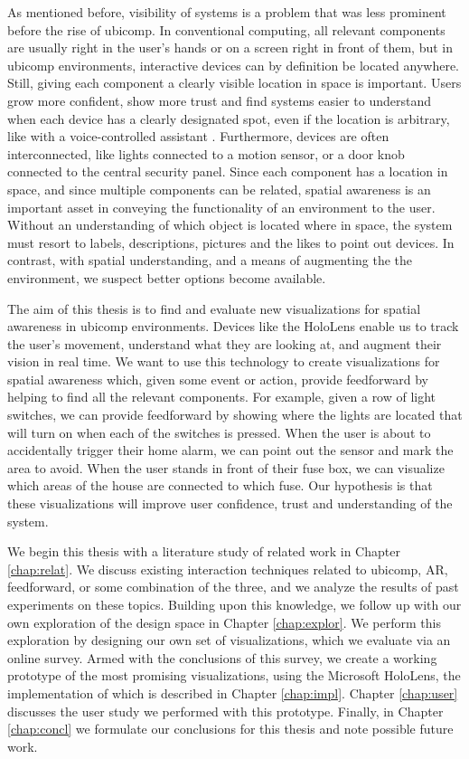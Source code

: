 As mentioned before, visibility of systems is a problem that was less prominent before the rise of ubicomp. In conventional computing, all relevant components are usually right in the user's hands or on a screen right in front of them, but in ubicomp environments, interactive devices can by definition be located anywhere. Still, giving each component a clearly visible location in space is important. Users grow more confident, show more trust and find systems easier to understand when each device has a clearly designated spot, even if the location is arbitrary, like with a voice-controlled assistant \cite{vermeulen2009bet}. Furthermore, devices are often interconnected, like lights connected to a motion sensor, or a door knob connected to the central security panel. Since each component has a location in space, and since multiple components can be related, spatial awareness is an important asset in conveying the functionality of an environment to the user. Without an understanding of which object is located where in space, the system must resort to labels, descriptions, pictures and the likes to point out devices. In contrast, with spatial understanding, and a means of augmenting the the environment, we suspect better options become available.

The aim of this thesis is to find and evaluate new visualizations for spatial awareness in ubicomp environments. Devices like the HoloLens enable us to track the user's movement, understand what they are looking at, and augment their vision in real time. We want to use this technology to create visualizations for spatial awareness which, given some event or action, provide feedforward by helping to find all the relevant components. For example, given a row of light switches, we can provide feedforward by showing where the lights are located that will turn on when each of the switches is pressed. When the user is about to accidentally trigger their home alarm, we can point out the sensor and mark the area to avoid. When the user stands in front of their fuse box, we can visualize which areas of the house are connected to which fuse. Our hypothesis is that these visualizations will improve user confidence, trust and understanding of the system.

We begin this thesis with a literature study of related work in Chapter \ref{chap:relat}. We discuss existing interaction techniques related to ubicomp, AR, feedforward, or some combination of the three, and we analyze the results of past experiments on these topics. Building upon this knowledge, we follow up with our own exploration of the design space in Chapter \ref{chap:explor}. We perform this exploration by designing our own set of visualizations, which we evaluate via an online survey. Armed with the conclusions of this survey, we create a working prototype of the most promising visualizations, using the Microsoft HoloLens, the implementation of which is described in Chapter \ref{chap:impl}. Chapter \ref{chap:user} discusses the user study we performed with this prototype. Finally, in Chapter \ref{chap:concl} we formulate our conclusions for this thesis and note possible future work.


